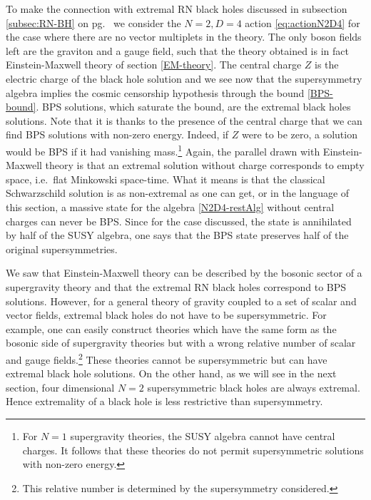 \documentclass[12pt,twoside]{book}
\begin{document}
To make the connection with extremal RN black holes discussed in subsection \ref{subsec:RN-BH} on pg.\ \pageref{subsec:RN-BH} we consider the $N=2, D=4$ action \eqref{eq:actionN2D4} for the case where there are no vector multiplets in the theory. The only boson fields left are the graviton and a gauge field, such that the theory obtained is in fact Einstein-Maxwell theory of section \ref{EM-theory}. The central charge $Z$ is the electric charge of the black hole solution and we see now that the supersymmetry algebra implies the cosmic censorship hypothesis through the bound \eqref{BPS-bound}. BPS solutions, which saturate the bound, are the extremal black holes solutions.
Note that it is thanks to the presence of the central charge that we can find BPS solutions with non-zero energy. Indeed, if $Z$ were to be zero, a solution would be BPS if it had vanishing mass.\footnote{
For $N=1$ supergravity theories, the SUSY algebra cannot have central charges. It follows that these theories do not permit supersymmetric solutions with non-zero energy.
}
Again, the parallel drawn with Einstein-Maxwell theory is that an extremal solution without charge corresponds to empty space, i.e.\ flat Minkowski space-time. What it means is that the classical Schwarzschild solution is as non-extremal as one can get, or in the language of this section, a massive state for the algebra \eqref{N2D4-restAlg} without central charges can never be BPS. Since for the case discussed, the state is annihilated by half of the SUSY algebra, one says that the BPS state preserves half of the original supersymmetries.\newline

We saw that Einstein-Maxwell theory can be described by the bosonic sector of a supergravity theory and that the extremal RN black holes correspond to BPS solutions. However, for a general theory of gravity coupled to a set of scalar and vector fields, extremal black holes do not have to be supersymmetric. For example, one can easily construct theories which have the same form as the bosonic side of supergravity theories but with a wrong relative number of scalar and gauge fields.\footnote{This relative number is determined by the supersymmetry considered.} These theories cannot be supersymmetric but can have extremal black hole solutions. On the other hand, as we will see in the next section, four dimensional $N=2$ supersymmetric black holes are always extremal. Hence extremality of a black hole is less restrictive than supersymmetry.

\end{document}
